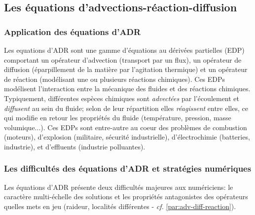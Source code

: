 \subsection{Les équations d'advections-réaction-diffusion}
    \subsubsection{Application des équations d'ADR}
    Les equations d'ADR sont une gamme d'équations au dérivées partielles (EDP) comportant un opérateur d'advection (transport par un flux),
    un opérateur de diffusion (éparpillement de la matière par l'agitation thermique) et un opérateur de réaction (modélisant une ou plusieurs réactions chimiques).
    Ces EDPs modélisent l'interaction entre la mécanique des fluides et des réactions chimiques. Typiquement, différentes espèces chimiques sont \textit{advectées} par l'écoulement et \textit{diffusent} au sein du fluide;
    selon de leur répartition elles \textit{réagissent} entre elles, ce qui modifie en retour les propriétés du fluide (température, pression, masse volumique...). 
    Ces EDPs sont entre-autre au coeur des problèmes de combustion (moteurs), d'explosion (militaire, sécurité industrielle), d'électrochimie (batteries, industrie), 
    et d'effluents (industrie polluantes).
    \subsubsection{Les difficultés des équations d'ADR et stratégies numériques}
    Les équations d'ADR présente deux difficultés majeures aux numériciens: le caractère multi-échelle des solutions et les propriétés antagonistes des opérateurs quelles mets en jeu
    (raideur, localités différentes - \textit{cf.} \ref{par:adv-diff-reaction}).\par

